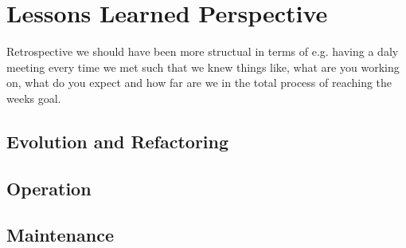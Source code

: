 \section{Lessons Learned Perspective}
Retrospective we should have been more structual in terms of e.g. having a daly meeting every time we met such that we knew things like, what are you working on, what do you expect and 
how far are we in the total process of reaching the weeks goal.

\subsection{Evolution and Refactoring}

\subsection{Operation}

\subsection{Maintenance}
